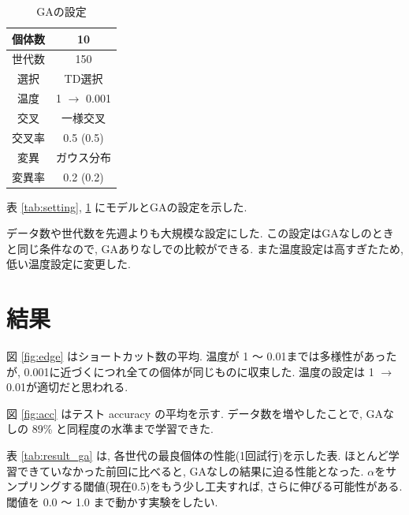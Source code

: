 \documentclass[twocolumn]{jarticle}     %
\begin{document}
\begin{table}[tb]
  \begin{center}
    \caption{GAの設定}
    \begin{tabular}{|c|c|} \hline
      個体数 & 10 \\ \hline
      世代数 & 150 \\ \hline \hline
      選択 & TD選択 \\ \hline
      温度 & 1 $\rightarrow$ 0.001 \\ \hline \hline
      交叉 & 一様交叉 \\ \hline
      交叉率 & 0.5 (0.5) \\ \hline \hline
      変異 & ガウス分布 \\ \hline
      変異率 & 0.2 (0.2) \\ \hline
    \end{tabular}
    \label{tab:setting_ga}
  \end{center}
\end{table}

表 \ref{tab:setting}, \ref{tab:setting_ga} にモデルとGAの設定を示した.

データ数や世代数を先週よりも大規模な設定にした. この設定はGAなしのときと同じ条件なので, GAありなしでの比較ができる.
また温度設定は高すぎたため, 低い温度設定に変更した.

\section{結果}


図 \ref{fig:edge} はショートカット数の平均.
温度が 1 ～ 0.01までは多様性があったが, 0.001に近づくにつれ全ての個体が同じものに収束した.
温度の設定は 1 $\rightarrow$ 0.01が適切だと思われる.

図 \ref{fig:acc} はテスト accuracy の平均を示す.
データ数を増やしたことで, GAなしの 89\% と同程度の水準まで学習できた.

表 \ref{tab:result_ga} は, 各世代の最良個体の性能(1回試行)を示した表.
ほとんど学習できていなかった前回に比べると, GAなしの結果に迫る性能となった.
$\alpha$をサンプリングする閾値(現在0.5)をもう少し工夫すれば, さらに伸びる可能性がある.
閾値を 0.0 ～ 1.0 まで動かす実験をしたい.
\end{document}
